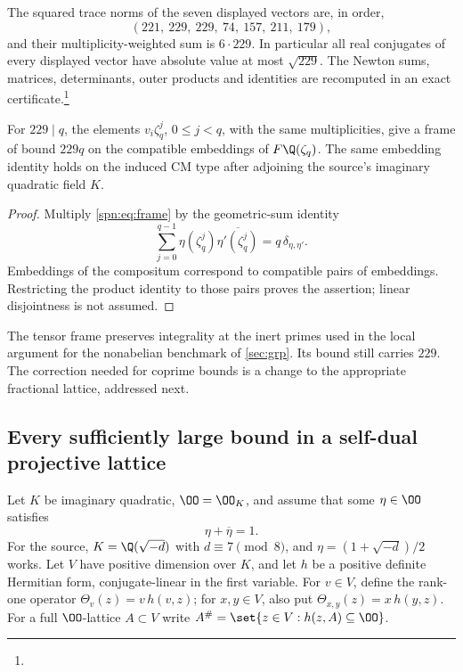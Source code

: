 The squared trace norms of the seven displayed vectors are, in order,
\[
 (221,\ 229,\ 229,\ 74,\ 157,\ 211,\ 179),
\]
and their multiplicity-weighted sum is $6\cdot229$. In particular all real
conjugates of every displayed vector have absolute value at most
$\sqrt{229}$. The Newton sums, matrices, determinants, outer products and
identities are recomputed in an exact
certificate.\footnote{}

\begin{corollary}\label{spn:cor:tensor}
For $229\mid q$, the elements $v_i\zeta_q^j$, $0\le j<q$, with the same
multiplicities, give a frame of bound $229q$ on the compatible embeddings of
$F\Q(\zeta_q)$. The same embedding identity holds on the induced CM type after
adjoining the source's imaginary quadratic field $K$.
\end{corollary}

\begin{proof}
Multiply \eqref{spn:eq:frame} by the geometric-sum identity
\[
 \sum_{j=0}^{q-1}\eta(\zeta_q^j)\overline{\eta'(\zeta_q^j)}
 =q\,\delta_{\eta,\eta'} .
\]
Embeddings of the compositum correspond to compatible pairs of embeddings.
Restricting the product identity to those pairs proves the assertion; linear
disjointness is not assumed.
\end{proof}

The tensor frame preserves integrality at the inert primes used in the local
argument for the nonabelian benchmark of \cref{sec:grp}. Its bound still
carries $229$. The correction needed for coprime bounds is a change to the
appropriate fractional lattice, addressed next.

\subsection{Every sufficiently large bound in a self-dual projective lattice}\label{spn:sec:projective}

Let $K$ be imaginary quadratic, $\OO=\OO_K$, and assume that some
$\eta\in\OO$ satisfies
\begin{equation}\label{spn:eq:traceone}
 \eta+\overline\eta=1 .
\end{equation}
For the source, $K=\Q(\sqrt{-d})$ with $d\equiv7\pmod8$, and
$\eta=(1+\sqrt{-d})/2$ works. Let $V$ have positive dimension over $K$, and
let $h$ be a positive definite Hermitian form, conjugate-linear in the first
variable. For $v\in V$, define the rank-one operator $\Theta_v(z)=v\,h(v,z)$;
for $x,y\in V$, also put $\Theta_{x,y}(z)=x\,h(y,z)$. For a full
$\OO$-lattice $A\subset V$ write
$A^\#=\set{z\in V:h(z,A)\subseteq\OO}$.

